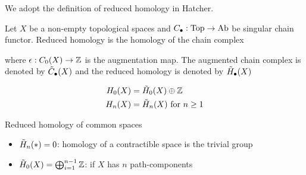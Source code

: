 \documentclass{article}
\begin{document}
We adopt the definition of reduced homology in Hatcher.
\begin{definition}
    Let $X$ be a non-empty topological spaces and $C_\bullet: \operatorname{Top} \to \operatorname{Ab}$ be singular chain functor. Reduced homology is the homology of the chain complex 
    \begin{center}
    \end{center}
    where $\epsilon: C_0(X) \to \mathbb{Z}$ is the augmentation map. The augmented chain complex is denoted by $\Tilde{C}_\bullet(X)$ and the reduced homology is denoted by $\Tilde{H}_\bullet(X)$
\end{definition}

\begin{remark}
    \begin{align*}
        H_0(X) &= \Tilde{H}_0(X) \oplus \mathbb{Z} \\
        H_n(X) &= \Tilde{H}_n(X) \text{ for } n \geq 1
    \end{align*}
\end{remark}

\begin{remark}
    Reduced homology of common spaces
    \begin{itemize}
        \item $\Tilde{H}_n(*) = 0$: homology of a contractible space is the trivial group
        \item $\Tilde{H}_0(X) = \bigoplus_{i=1}^{n-1} \mathbb{Z}$: if $X$ has $n$ path-components
    \end{itemize}
\end{remark}
\end{document}
